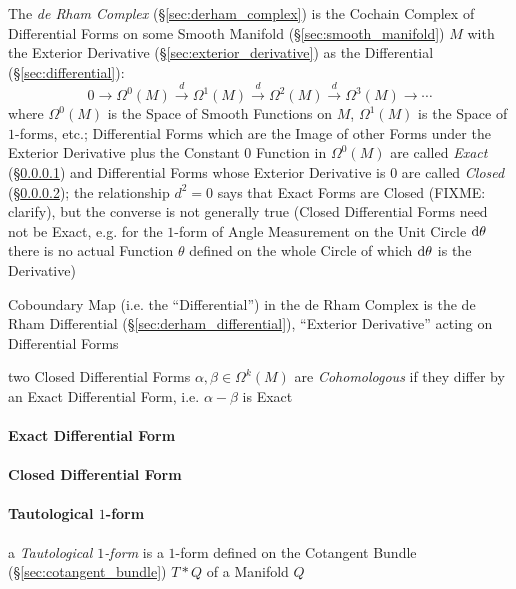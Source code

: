 \asterism

The \emph{de Rham Complex} (\S\ref{sec:derham_complex}) is the Cochain Complex
of Differential Forms on some Smooth Manifold (\S\ref{sec:smooth_manifold}) $M$
with the Exterior Derivative (\S\ref{sec:exterior_derivative}) as the
Differential (\S\ref{sec:differential}):
\[
  0 \rightarrow \Omega^0(M) \xrightarrow{d} \Omega^1(M) \xrightarrow{d}
  \Omega^2(M) \xrightarrow{d} \Omega^3(M) \rightarrow \cdots
\]
where $\Omega^0(M)$ is the Space of Smooth Functions on $M$, $\Omega^1(M)$ is
the Space of $1$-forms, etc.; Differential Forms which are the Image of other
Forms under the Exterior Derivative plus the Constant $0$ Function in
$\Omega^0(M)$ are called \emph{Exact} (\S\ref{sec:exact_differential_form}) and
Differential Forms whose Exterior Derivative is $0$ are called \emph{Closed}
(\S\ref{sec:closed_differential_form}); the relationship $d^2 = 0$ says that
Exact Forms are Closed (FIXME: clarify), but the converse is not generally true
(Closed Differential Forms need not be Exact, e.g. for the $1$-form of Angle
Measurement on the Unit Circle $\mathrm{d}\theta$ there is no actual Function
$\theta$ defined on the whole Circle of which $\mathrm{d}\theta$ is the
Derivative)

Coboundary Map (i.e. the ``Differential'') in the de Rham Complex is the de Rham
Differential (\S\ref{sec:derham_differential}), ``Exterior Derivative'' acting
on Differential Forms

two Closed Differential Forms $\alpha, \beta \in \Omega^k(M)$ are
\emph{Cohomologous} if they differ by an Exact Differential Form, i.e. $\alpha -
\beta$ is Exact



\paragraph{Exact Differential Form}\label{sec:exact_differential_form}\hfill

\paragraph{Closed Differential Form}\label{sec:closed_differential_form}\hfill

\paragraph{Tautological $1$-form}\label{sec:tautological_1form}\hfill

a \emph{Tautological $1$-form} is a $1$-form defined on the Cotangent Bundle
(\S\ref{sec:cotangent_bundle}) $T * Q$ of a Manifold $Q$

